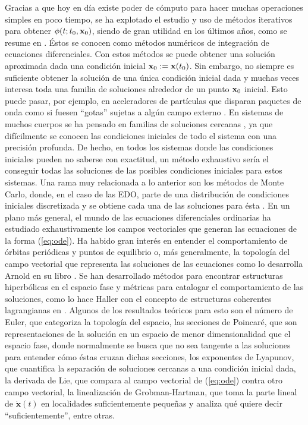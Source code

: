 Gracias a que hoy en día existe poder de cómputo para hacer muchas operaciones simples en poco tiempo, se ha explotado el estudio y uso de métodos iterativos para obtener $\phi(t;t_0,\mathbf{x}_0)$, siendo de gran utilidad en los últimos años, como se resume en \cite{Butcher2008}. Éstos se conocen como métodos numéricos de integración de ecuaciones diferenciales. Con estos métodos se puede obtener una solución aproximada dada una condición inicial $\mathbf{x}_0 := \mathbf{x}(t_0)$. Sin embargo, no siempre es suficiente obtener la solución de una única condición inicial dada y muchas veces interesa toda una familia de soluciones alrededor de un punto $\mathbf{x}_0$ inicial. Esto puede pasar, por ejemplo, en aceleradores de partículas que disparan paquetes de onda como si fuesen ``gotas'' sujetas a algún campo externo \cite{Peskin1996}. En sistemas de muchos cuerpos se ha pensado en familias de soluciones cercanas \cite{Henon1974}, ya que difícilmente se conocen las condiciones iniciales de todo el sistema con una precisión profunda. De hecho, en todos los sistemas donde las condiciones iniciales pueden no saberse con exactitud, un método exhaustivo sería el conseguir todas las soluciones de las posibles condiciones iniciales para estos sistemas. Una rama muy relacionada a lo anterior son los métodos de Monte Carlo, donde, en el caso de las EDO, parte de una distribución de condiciones iniciales discretizada y se obtiene cada una de las soluciones para ésta \cite{Kroese2011,Spigler1987}.  
En un plano más general, el mundo de las ecuaciones diferenciales ordinarias ha estudiado exhaustivamente los campos vectoriales que generan las ecuaciones de la forma (\ref{eq:ode}). Ha habido gran interés en entender el comportamiento de órbitas periódicas y puntos de equilibrio o, más generalmente, la topología del campo vectorial que representa las soluciones de las ecuaciones como lo desarrolla Arnold en su libro \cite{Arnold1989}. Se han desarrollado métodos para encontrar estructuras hiperbólicas en el espacio fase y métricas para catalogar el comportamiento de las soluciones, como lo hace Haller con el concepto de estructuras coherentes lagrangianas en \cite{Haller2011}. Algunos de los resultados teóricos para esto son el número de Euler, que categoriza la topología del espacio, las secciones de Poincaré, que son representaciones de la solución en un espacio de menor dimensionalidad que el espacio fase, donde normalmente se busca que no sea tangente a las soluciones para entender cómo éstas cruzan dichas secciones, los exponentes de Lyapunov, que cuantifica la separación de soluciones cercanas a una condición inicial dada, la derivada de Lie, que compara al campo vectorial de (\ref{eq:ode}) contra otro campo vectorial, la linealización de Grobman-Hartman, que toma la parte lineal de $\dot{\mathbf{x}}(t)$ en localidades suficientemente pequeñas y analiza qué quiere decir ``suficientemente'', entre otras. 

